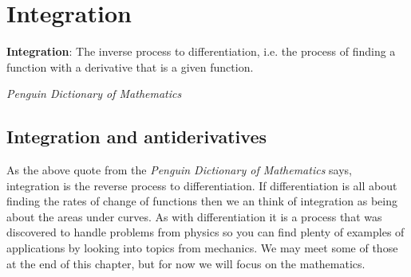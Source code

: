 \chapter{Integration}
\label{sec:integration}
\epigraph{\textbf{Integration}: The inverse process to differentiation, i.e. the process of finding a function with a derivative that is a given function. }{\textit{Penguin Dictionary of Mathematics}}

\section{Integration and antiderivatives}
As the above quote from the \textit{Penguin Dictionary of Mathematics} says, integration is the reverse process to differentiation. If differentiation is all about finding the rates of change of functions then we an think of integration as being about the areas under curves.  As with differentiation it is a process that was discovered to handle problems from physics so you can find plenty of examples of applications by looking into topics from mechanics. We may meet some of those at the end of this chapter, but for now we will focus on the mathematics.\\

